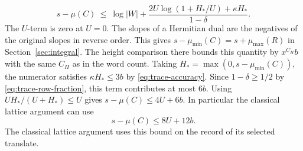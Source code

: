 \begin{equation}
\label{eq:trace-slope}
 s-\mu(C)\ \le\ \log|W|+
 \frac{2U\log(1+H_*/U)+\kappa H_*}{1-\delta}.
\end{equation}
The \(U\)-term is zero at \(U=0\). The slopes of a Hermitian dual
are the negatives of the original slopes in reverse order.
\cite[Properties~5.14(2), Hermitian case, arXiv version]{rk3gaudron}
This gives \(s-\mu_{\min}(C)=s+\mu_{\max}(R)\) in
Section~\ref{sec:integral}.
The height comparison there bounds this quantity by \(x^{C_H}b\)
with the same \(C_H\) as in the word count. Taking
\(H_*=\max(0,s-\mu_{\min}(C))\), the numerator satisfies
\(\kappa H_*\le3b\) by \eqref{eq:trace-accuracy}.
Since \(1-\delta\ge1/2\) by \eqref{eq:trace-row-fraction}, this term
contributes at most \(6b\). Using \(UH_*/(U+H_*)\le U\) gives
\(s-\mu(C)\le4U+6b\). In particular the classical lattice argument
can use
\begin{equation}
\label{eq:trace-sharp-slope}
  s-\mu(C)\le 8U+12b.
\end{equation}
The classical lattice argument uses this bound on the record of
its selected translate.
